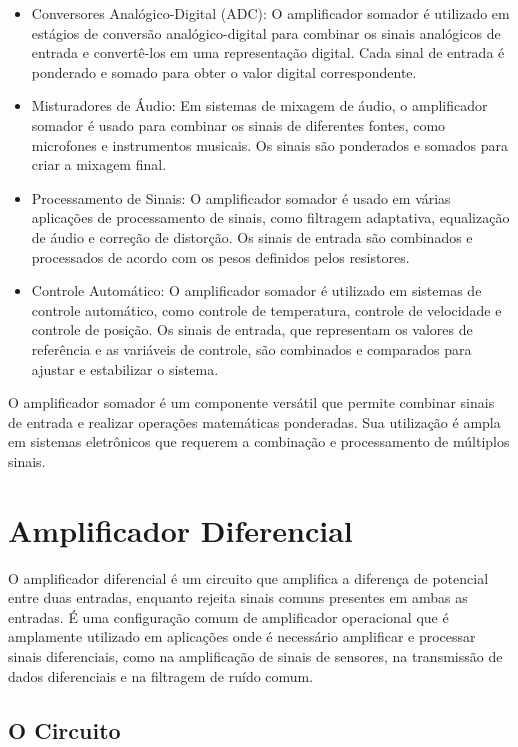 \documentclass[12pt,twoside, a4paper, twocolumn]{article}
\begin{document}
\begin{itemize}
    \item Conversores Analógico-Digital (ADC): O amplificador somador é utilizado em estágios de conversão analógico-digital para combinar os sinais analógicos de entrada e convertê-los em uma representação digital. Cada sinal de entrada é ponderado e somado para obter o valor digital correspondente.
    \item Misturadores de Áudio: Em sistemas de mixagem de áudio, o amplificador somador é usado para combinar os sinais de diferentes fontes, como microfones e instrumentos musicais. Os sinais são ponderados e somados para criar a mixagem final.
    \item Processamento de Sinais: O amplificador somador é usado em várias aplicações de processamento de sinais, como filtragem adaptativa, equalização de áudio e correção de distorção. Os sinais de entrada são combinados e processados de acordo com os pesos definidos pelos resistores.
    \item Controle Automático: O amplificador somador é utilizado em sistemas de controle automático, como controle de temperatura, controle de velocidade e controle de posição. Os sinais de entrada, que representam os valores de referência e as variáveis de controle, são combinados e comparados para ajustar e estabilizar o sistema.
\end{itemize}


O amplificador somador é um componente versátil que permite combinar sinais de entrada e realizar operações matemáticas ponderadas. Sua utilização é ampla em sistemas eletrônicos que requerem a combinação e processamento de múltiplos sinais.


\newpage


\section{Amplificador Diferencial}


O amplificador diferencial é um circuito que amplifica a diferença de potencial entre duas entradas, enquanto rejeita sinais comuns presentes em ambas as entradas. É uma configuração comum de amplificador operacional que é amplamente utilizado em aplicações onde é necessário amplificar e processar sinais diferenciais, como na amplificação de sinais de sensores, na transmissão de dados diferenciais e na filtragem de ruído comum.


\subsection{O Circuito}
\end{document}
